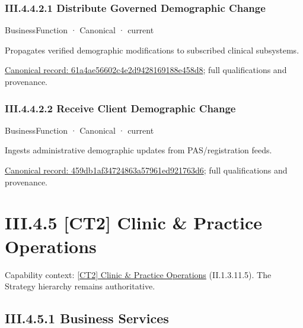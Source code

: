 \subsubsection*{III.4.4.2.1 Distribute Governed Demographic Change}
\label{navigation:III.4.4.2.1}

\label{element:61a4ae56602c4e2d9428169188e458d8}
{\small BusinessFunction · Canonical · current}\par

Propagates verified demographic modifications to subscribed clinical subsystems.


{\footnotesize \href{../../../../continuum/business/business-function/61a4ae56602c4e2d9428169188e458d8.md}{Canonical record: 61a4ae56602c4e2d9428169188e458d8}; full qualifications and provenance.}\par
\subsubsection*{III.4.4.2.2 Receive Client Demographic Change}
\label{navigation:III.4.4.2.2}

\label{element:459db1af34724863a57961ed921763d6}
{\small BusinessFunction · Canonical · current}\par

Ingests administrative demographic updates from PAS/registration feeds.


{\footnotesize \href{../../../../continuum/business/business-function/459db1af34724863a57961ed921763d6.md}{Canonical record: 459db1af34724863a57961ed921763d6}; full qualifications and provenance.}\par
\section*{III.4.5 [CT2] Clinic \& Practice Operations}
\label{navigation:III.4.5}

{\small Capability context: \hyperref[element:3dffe63e03124efab255204ee4e9a5d9]{[CT2] Clinic \& Practice Operations} (II.1.3.11.5). The Strategy hierarchy remains authoritative.}\par
\subsection*{III.4.5.1 Business Services}
\label{navigation:III.4.5.1}

